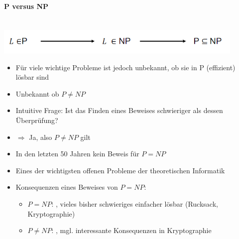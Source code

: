 \documentclass[
    ngerman,
    color=3b,
    dark_mode,
    load_common, %
    summary,
    boxarc,
]{tuda_summary}
\begin{document}
\paragraph{P versus NP}\mbox{}\vspace{1em}\\
\includegraphics[width=12cm]{pictures/pnp.PNG}
\begin{itemize}
      \item Für viele wichtige Probleme ist jedoch unbekannt, ob sie in P (effizient) lösbar sind
      \item Unbekannt ob $P \neq NP$
      \item Intuitive Frage: Ist das Finden eines Beweises schwieriger als dessen Überprüfung?
      \item[] $\Rightarrow$ Ja, also $P \neq NP$ gilt
      \item In den letzten 50 Jahren kein Beweis für $P = NP$
      \item Eines der wichtigsten offenen Probleme der theoretischen Informatik
      \item Konsequenzen eines Beweises von $P=NP$:
            \begin{itemize}
                  \item $P=NP$: , vieles bisher schwieriges einfacher lösbar (Rucksack, Kryptographie)
                  \item $P\neq NP$: , mgl. interessante Konsequenzen in Kryptographie
            \end{itemize}
\end{itemize}
\clearpage
\end{document}
